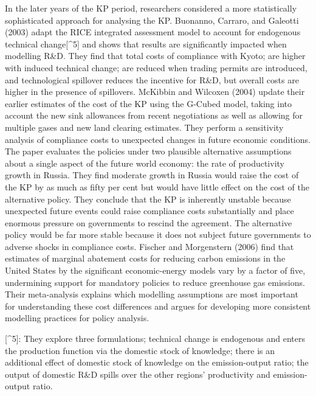 \documentclass[
  letterpaper,
  DIV=11,
  numbers=noendperiod]{scrartcl}
\begin{document}
In the later years of the KP period, researchers considered a more
statistically sophisticated approach for analysing the KP. Buonanno,
Carraro, and Galeotti (2003) adapt the RICE integrated assessment model
to account for endogenous technical change{[}\^{}5{]} and shows that
results are significantly impacted when modelling R\&D. They find that
total costs of compliance with Kyoto; are higher with induced technical
change; are reduced when trading permits are introduced, and
technological spillover reduces the incentive for R\&D, but overall
costs are higher in the presence of spillovers. McKibbin and Wilcoxen
(2004) update their earlier estimates of the cost of the KP using the
G-Cubed model, taking into account the new sink allowances from recent
negotiations as well as allowing for multiple gases and new land
clearing estimates. They perform a sensitivity analysis of compliance
costs to unexpected changes in future economic conditions. The paper
evaluates the policies under two plausible alternative assumptions about
a single aspect of the future world economy: the rate of productivity
growth in Russia. They find moderate growth in Russia would raise the
cost of the KP by as much as fifty per cent but would have little effect
on the cost of the alternative policy. They conclude that the KP is
inherently unstable because unexpected future events could raise
compliance costs substantially and place enormous pressure on
governments to rescind the agreement. The alternative policy would be
far more stable because it does not subject future governments to
adverse shocks in compliance costs. Fischer and Morgenstern (2006) find
that estimates of marginal abatement costs for reducing carbon emissions
in the United States by the significant economic-energy models vary by a
factor of five, undermining support for mandatory policies to reduce
greenhouse gas emissions. Their meta-analysis explains which modelling
assumptions are most important for understanding these cost differences
and argues for developing more consistent modelling practices for policy
analysis.

{[}\^{}5{]}: They explore three formulations; technical change is
endogenous and enters the production function via the domestic stock of
knowledge; there is an additional effect of domestic stock of knowledge
on the emission-output ratio; the output of domestic R\&D spills over
the other regions' productivity and emission-output ratio.
\end{document}
